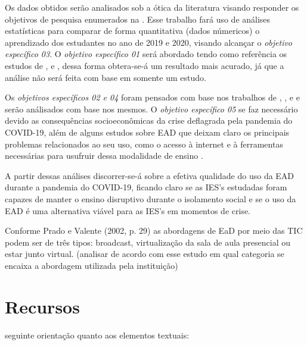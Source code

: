 \documentclass[
	arial,
	12pt,				%
	openright,			%
	twoside,			%
	a4paper,			%
	chapter=TITLE,		%
	english,			%
	french,				%
	spanish,			%
	brazil,				%
	]{abntex2}
\begin{document}
Os dados obtidos serão analisados sob a ótica da literatura visando responder os  objetivos de pesquisa enumerados na . Esse trabalho fará uso de análises estatísticas para comparar de forma quantitativa (dados númericos) o aprendizado dos estudantes no ano de 2019 e 2020, visando alcançar o \textit{objetivo específico 03}. O \textit{objetivo específico 01} será abordado tendo como referência os estudos de ,  e , dessa forma obtera-se-á um resultado mais acurado, já que a análise não será feita com base em somente um estudo. 

Os \textit{objetivos específicos 02 e 04} foram pensados com base nos trabalhos de , ,  e  e serão análisados com base nos mesmos. O \textit{objetivo específico 05} se faz necessário devido as consequências socioeconômicas da crise deflagrada pela pandemia do COVID-19, além de alguns estudos sobre EAD que deixam claro os principais problemas relacionados ao seu uso, como o acesso à internet e à ferramentas necessárias para usufruir dessa modalidade de ensino \cite{benakouche2000educaccao, arieira2009avaliaccao}.

A partir dessas análises discorrer-se-á sobre a efetiva qualidade do uso da EAD durante a pandemia do COVID-19, ficando claro se as IES's estudadas foram capazes de manter o ensino disruptivo durante o isolamento social e se o uso da EAD é uma alternativa viável para as IES's em momentos de crise.


Conforme Prado e Valente (2002, p. 29)
as abordagens de EaD por meio das TIC podem
ser de três tipos: broadcast, virtualização da sala
de aula presencial ou estar junto virtual. (analisar de acordo com esse estudo em qual categoria se encaixa a abordagem utilizada pela instituição)

\chapter{Recursos}

seguinte orientação quanto aos elementos textuais:
\end{document}
